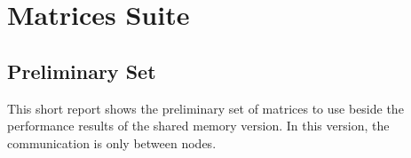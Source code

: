 \section{Matrices Suite} \label{matricesSuite}


\subsection*{Preliminary Set}
This short report shows the preliminary set of matrices to use beside the performance results of the shared memory version. In this version, the communication is only between nodes. 


\medskip

